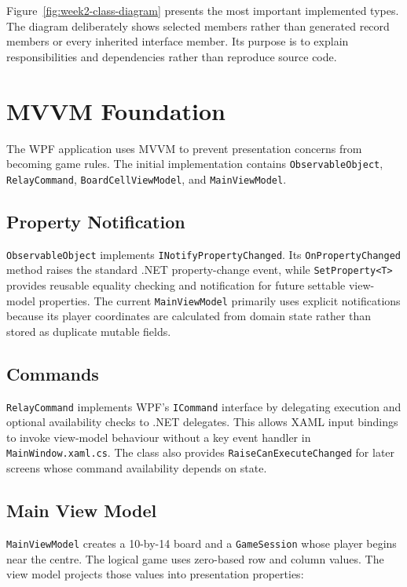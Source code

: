 

Figure~\ref{fig:week2-class-diagram} presents the most important implemented types. The diagram deliberately shows selected members rather than generated record members or every inherited interface member. Its purpose is to explain responsibilities and dependencies rather than reproduce source code.

\section{MVVM Foundation}

The WPF application uses MVVM to prevent presentation concerns from becoming game rules. The initial implementation contains \texttt{ObservableObject}, \texttt{RelayCommand}, \texttt{BoardCellViewModel}, and \texttt{MainViewModel}.

\subsection{Property Notification}

\texttt{ObservableObject} implements \texttt{INotifyPropertyChanged}. Its \texttt{OnPropertyChanged} method raises the standard .NET property-change event, while \texttt{SetProperty<T>} provides reusable equality checking and notification for future settable view-model properties. The current \texttt{MainViewModel} primarily uses explicit notifications because its player coordinates are calculated from domain state rather than stored as duplicate mutable fields.

\subsection{Commands}

\texttt{RelayCommand} implements WPF's \texttt{ICommand} interface by delegating execution and optional availability checks to .NET delegates. This allows XAML input bindings to invoke view-model behaviour without a key event handler in \texttt{MainWindow.xaml.cs}. The class also provides \texttt{RaiseCanExecuteChanged} for later screens whose command availability depends on state.

\subsection{Main View Model}

\texttt{MainViewModel} creates a 10-by-14 board and a \texttt{GameSession} whose player begins near the centre. The logical game uses zero-based row and column values. The view model projects those values into presentation properties:

